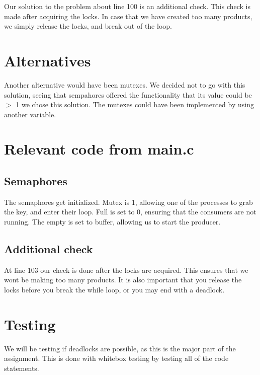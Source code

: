 Our solution to the problem about line 100 is an additional check. This check is made after acquiring the locks.
In case that we have created too many products, we simply release the locks, and break out of the loop. \\



\section{Alternatives}
Another alternative would have been mutexes. We decided not to go with this solution, seeing that sempahores offered the functionality that its value could be $>$ 1 we chose this solution. The mutexes could have been implemented by using another variable.

\section{Relevant code from main.c}
\subsection{Semaphores}
The semaphores get initialized.	
Mutex is 1, allowing one of the processes to grab the key, and enter their loop. Full is set to 0, ensuring that the consumers are not running. The empty is set to buffer, allowing us to start the producer.\\



\subsection{Additional check}
At line 103 our check is done after the locks are acquired. This ensures that we wont be making too many products. It is also important that you release the locks before you break the while loop, or you may end with a deadlock.




\section{Testing}

We will be testing if deadlocks are possible, as this is the major part of the assignment. This is done with whitebox testing by testing all of the code statements.\\

